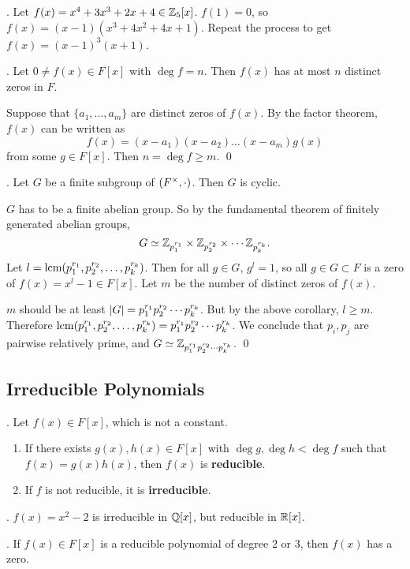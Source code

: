 \ex. Let \(f(x) = x^4 + 3x^3 + 2x + 4 \in \mathbb{Z}_5[x]\). \(f(1) = 0\), so \(f(x) = (x-1)(x^3 + 4x^2 + 4x + 1)\). Repeat the process to get \(f(x) = (x-1)^3(x+1)\).

\cor. Let \(0 \neq f(x) \in F[x]\) with \(\deg f = n\). Then \(f(x)\) has at most \(n\) distinct zeros in \(F\).

\pf Suppose that \(\{a_1, \dots, a_m\}\) are distinct zeros of \(f(x)\). By the factor theorem, \(f(x)\) can be written as
\[
    f(x) = (x - a_1)(x - a_2) \dots (x-a_m)g(x)
\]
from some \(g \in F[x]\). Then \(n = \deg f \geq m\). \qed

\cor. Let \(G\) be a finite subgroup of \((F^\times, \cdot)\). Then \(G\) is cyclic.

\pf \(G\) has to be a finite abelian group. So by the fundamental theorem of finitely generated abelian groups,
\[
    G \simeq \mathbb{Z}_{p_1^{r_1}} \times \mathbb{Z}_{p_2^{r_2}} \times \cdots \mathbb{Z}_{p_k^{r_k}}.
\]
Let \(l = {\rm lcm} (p_1^{r_1}, p_2^{r_2}, \dots, p_k^{r_k})\). Then for all \(g \in G\), \(g^l = 1\), so all \(g \in G \subset F\) is a zero of \(f(x) = x^l - 1 \in F[x]\). Let \(m\) be the number of distinct zeros of \(f(x)\).

\(m\) should be at least \(\left| G \right| = p_1^{r_1}p_2^{r_2}\cdots p_k^{r_k}\). But by the above corollary, \(l \geq m\). Therefore \({\rm lcm} (p_1^{r_1}, p_2^{r_2}, \dots, p_k^{r_k}) = p_1^{r_1}p_2^{r_2}\cdots p_k^{r_k}\). We conclude that \(p_i, p_j\) are pairwise relatively prime, and \(G \simeq \mathbb{Z}_{p_1^{r_1}p_2^{r_2}\cdots p_k^{r_k}}\). \qed

\pagebreak

\subsection*{Irreducible Polynomials}

.  Let \(f(x) \in F[x]\), which is not a constant.
\begin{enumerate}
    \item If there exists \(g(x), h(x) \in F[x]\) with \(\deg g, \deg h < \deg f\) such that \(f(x) = g(x)h(x)\), then \(f(x)\) is \textbf{reducible}.
    \item If \(f\) is not reducible, it is \textbf{irreducible}.
\end{enumerate}

\ex. \(f(x) = x^2 - 2\) is irreducible in \(\mathbb{Q}[x]\), but reducible in \(\mathbb{R}[x]\).

\thm. If \(f(x) \in F[x]\) is a reducible polynomial of degree \(2\) or \(3\), then \(f(x)\) has a zero.

